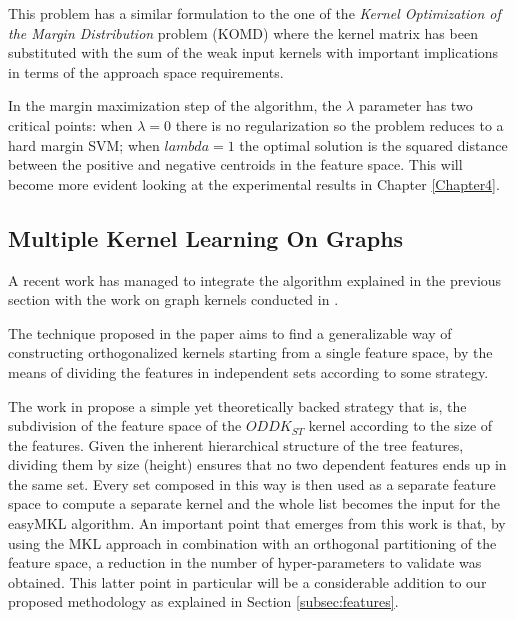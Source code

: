 This problem has a similar formulation to the one of the \emph{Kernel Optimization of the
Margin Distribution} problem (KOMD) \cite{Aiolli2008} where the kernel matrix has been
substituted with the sum of the weak input kernels with important implications
in terms of the approach space requirements.

In the margin maximization step of the algorithm, the $\lambda$ parameter
has two critical points: when $\lambda = 0$ there is no regularization so the
problem reduces to a hard margin SVM; when $lambda = 1$ the optimal solution is
the squared distance between the positive and negative centroids in the feature
space.
This will become more evident looking at the experimental results in Chapter
\ref{Chapter4}.

\subsection{Multiple Kernel Learning On Graphs}
\label{subsec:gmkl}
A recent work \cite{gmkl} has managed to integrate the algorithm explained in the
previous section with the work on graph kernels conducted in \cite{DBLP:conf/sdm/MartinoNS12}.

The technique proposed in the paper aims to find a generalizable way of constructing
orthogonalized kernels starting from a single feature space, by the means of 
dividing the features in independent sets according to some strategy.

The work in \cite{gmkl} propose a simple yet theoretically backed strategy that is,
the subdivision of the feature space of the $ODDK_{ST}$ kernel according to the
size of the features.
Given the inherent hierarchical structure of the tree features, dividing them by
size (height) ensures that no two dependent features ends up in the same set.
Every set composed in this way is then used as a separate feature space to compute
a separate kernel and the whole list becomes the input for the easyMKL algorithm.
An important point that emerges from this work is that, by using the MKL approach
in combination with an orthogonal partitioning of the feature space, a reduction
in the number of hyper-parameters to validate was obtained.
This latter point in particular will be a considerable addition to our proposed
methodology as explained in Section \ref{subsec:features}.


